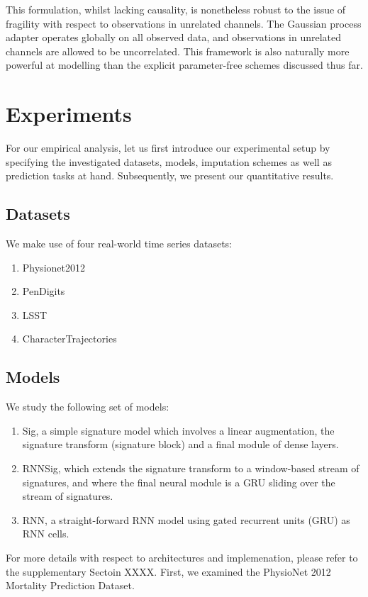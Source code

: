 \documentclass{article}
\begin{document}
This formulation, whilst lacking causality, is nonetheless robust to the issue of fragility with respect to observations in unrelated channels. The Gaussian process adapter operates globally on all observed data, and observations in unrelated channels are allowed to be uncorrelated. This framework is also naturally more powerful at modelling than the explicit parameter-free schemes discussed thus far.

\section{Experiments}
For our empirical analysis, let us first introduce our experimental setup by specifying the investigated datasets, models, imputation schemes as well as prediction tasks at hand. Subsequently, we present our quantitative results.
\subsection{Datasets}
We make use of four real-world time series datasets:
\begin{enumerate}
    \item Physionet2012
    \item PenDigits
    \item LSST
    \item CharacterTrajectories
\end{enumerate}

\subsection{Models}
We study the following set of models:
\begin{enumerate}
    \item Sig, a simple signature model which involves a linear augmentation, the signature transform (signature block) and a final module of dense layers.
    \item RNNSig, which extends the signature transform to a window-based stream of signatures, and where the final neural module is a GRU sliding over the stream of signatures.
    \item RNN, a straight-forward RNN model using gated recurrent units (GRU) as RNN cells.
\end{enumerate}
For more details with respect to architectures and implemenation, please refer to the supplementary Sectoin XXXX.
First, we examined the PhysioNet 2012 Mortality Prediction Dataset.
\end{document}
